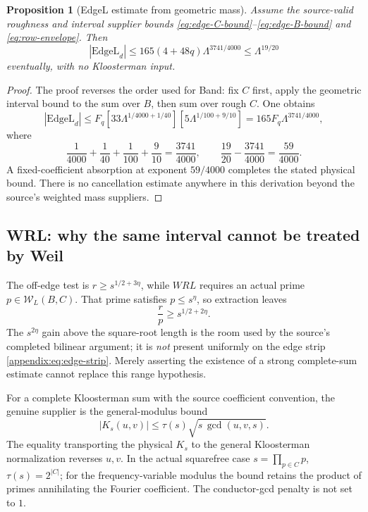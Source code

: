 \documentclass[11pt]{article}
\newcommand{\Lam}{\Lambda}
\newtheorem{proposition}[theorem]{Proposition}
\theoremstyle{definition}
\theoremstyle{remark}
\newcommand{\1}{\mathbf 1}
\begin{document}
\begin{proposition}[EdgeL estimate from geometric mass]
\label{prop:edge-chain}
Assume the source-valid roughness and interval supplier bounds
\eqref{eq:edge-C-bound}--\eqref{eq:edge-B-bound} and
\eqref{eq:row-envelope}. Then
\begin{equation}\label{eq:edge-chain}
 |\mathrm{EdgeL}_d|\le165(4+48q)
 \Lam^{3741/4000}\le\Lam^{19/20}
\end{equation}
eventually, with no Kloosterman input.
\end{proposition}
\begin{proof}
The proof reverses the order used for Band: fix $C$ first,
apply the geometric interval bound to the sum over $B$,
then sum over rough $C$. One obtains
\[
 |\mathrm{EdgeL}_d|
 \le F_q[33\Lam^{1/4000+1/40}]
          [5\Lam^{1/100+9/10}]
 =165F_q\Lam^{3741/4000},
\]
where
\[
 \frac1{4000}+\frac1{40}+\frac1{100}+\frac9{10}
 =\frac{3741}{4000},\qquad
 \frac{19}{20}-\frac{3741}{4000}=\frac{59}{4000}.
\]
A fixed-coefficient absorption at exponent $59/4000$
completes the stated physical bound. There is no cancellation
estimate anywhere in this derivation beyond the source's
weighted mass suppliers.
\end{proof}

\subsection{WRL: why the same interval cannot be treated by Weil}

The off-edge test is $r\ge s^{1/2+3\eta}$, while $WRL$ requires
an actual prime $p\in\mathcal W_L(B,C)$.
That prime satisfies $p\le s^\eta$, so extraction leaves
\begin{equation}\label{eq:weil-cofactor}
 \frac rp\ge s^{1/2+2\eta}.
\end{equation}
The $s^{2\eta}$ gain above the square-root length is the room
used by the source's completed bilinear argument; it is
\emph{not} present uniformly on the edge strip
\eqref{appendix:eq:edge-strip}. Merely asserting the existence of
a strong complete-sum estimate cannot replace this range
hypothesis.

For a complete Kloosterman sum with the source coefficient
convention, the genuine supplier is the general-modulus bound
\begin{equation}\label{eq:weil-contract}
 |K_s(u,v)|\le\tau(s)\sqrt{s\,\gcd(u,v,s)}.
\end{equation}
The equality transporting the physical $K_s$ to the general
Kloosterman normalization reverses $u,v$. In the actual
squarefree case $s=\prod_{p\in C}p$, $\tau(s)=2^{|C|}$;
for the frequency-variable modulus the bound retains the
product of primes annihilating the Fourier coefficient.
The conductor-gcd penalty is not set to $1$.
\end{document}
